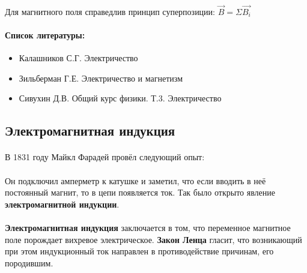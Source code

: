 \documentclass[dvipdfmx]{article}
\begin{document}
\paragraph{}

Для магнитного поля справедлив принцип суперпозиции: $\vec{B} = \Sigma\vec{B_i}$

\paragraph{Список литературы:}

\begin{itemize}
\item
  Калашников С.Г. Электричество
\item
  Зильберман Г.Е. Электричество и магнетизм
\item
  Сивухин Д.В. Общий курс физики. Т.3. Электричество
\end{itemize}

\subsection{Электромагнитная индукция}
\paragraph{}

В 1831 году Майкл Фарадей провёл следующий опыт:

\paragraph{}
  \noindent{}

Он подключил амперметр к катушке и заметил, что если вводить в неё постоянный магнит, то в цепи появляется ток.
Так было открыто явление \textbf{электромагнитной индукции}.

\paragraph{}

\textbf{Электромагнитная индукция} заключается в том, что переменное магнитное поле
порождает вихревое электрическое. \textbf{Закон Ленца} гласит, что возникающий при этом индукционный ток
направлен в противодействие причинам, его породившим.
\end{document}
